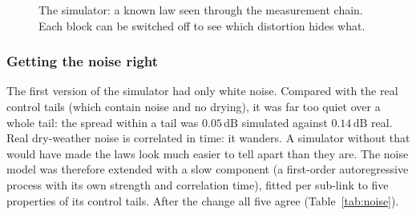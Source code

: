 \documentclass[11pt,a4paper]{article}
\newcommand{\dB}{\,\mathrm{dB}}
\begin{document}
\begin{figure}[H]
\centering
{}
\caption{The simulator: a known law seen through the measurement chain. Each block can be switched off to see which
distortion hides what.}
\label{fig:obs}
\end{figure}

\subsubsection*{Getting the noise right}

The first version of the simulator had only white noise. Compared with the real control tails (which contain noise
and no drying), it was far too quiet over a whole tail: the spread within a tail was $0.05\dB$ simulated against
$0.14\dB$ real. Real dry-weather noise is correlated in time: it wanders. A simulator without that would have made
the laws look much easier to tell apart than they are. The noise model was therefore extended with a slow component
(a first-order autoregressive process with its own strength and correlation time), fitted per sub-link to five
properties of its control tails. After the change all five agree (Table~\ref{tab:noise}).
\end{document}
